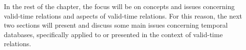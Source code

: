
	
	
	



In the rest of the chapter, the focus will be on concepts and issues concerning valid-time relations and aspects of valid-time relations. For this reason, the next two sections will present and discuss some main issues concerning temporal databases, specifically applied to or presented in the context of valid-time relations.

